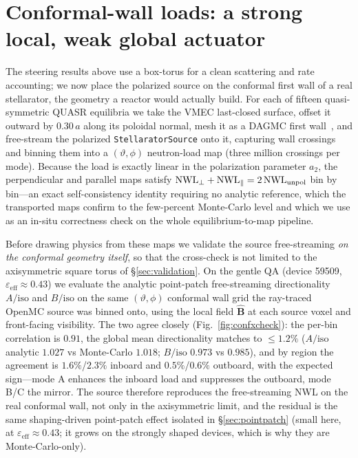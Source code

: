 \documentclass[11pt]{article}
\newcommand{\Bhat}{\hat{\bm{B}}}
\newcommand{\eps}{\varepsilon}
\newcommand{\epseff}{\eps_{\mathrm{eff}}}
\newcommand{\NWL}{\mathrm{NWL}}
\newcommand{\iso}{\mathrm{iso}}
\begin{document}
\section{Conformal-wall loads: a strong local, weak global actuator}
\label{sec:conformal}

The steering results above use a box-torus for a clean scattering and rate accounting; we
now place the polarized source on the conformal first wall of a real stellarator, the
geometry a reactor would actually build. For each of fifteen quasi-symmetric QUASR
equilibria we take the VMEC last-closed surface, offset it outward by $0.30\,a$ along its
poloidal normal, mesh it as a DAGMC first wall~\cite{dagmc}, and free-stream the polarized
\texttt{StellaratorSource} onto it, capturing wall crossings and binning them into a
$(\vartheta,\phi)$ neutron-load map (three million crossings per mode). Because the load is
exactly linear in the polarization parameter $a_2$, the perpendicular and parallel maps
satisfy $\NWL_{\perp}+\NWL_{\parallel}=2\,\NWL_{\rm unpol}$ bin by bin---an exact
self-consistency identity requiring no analytic reference, which the transported maps
confirm to the few-percent Monte-Carlo level and which we use as an in-situ correctness
check on the whole equilibrium-to-map pipeline.

Before drawing physics from these maps we validate the source free-streaming \emph{on the
conformal geometry itself}, so that the cross-check is not limited to the axisymmetric
square torus of \S\ref{sec:validation}. On the gentle QA (device 59509,
$\epseff\approx0.43$) we evaluate the analytic point-patch free-streaming directionality
$A/\iso$ and $B/\iso$ on the same $(\vartheta,\phi)$ conformal wall grid the ray-traced
OpenMC source was binned onto, using the local field $\Bhat$ at each source voxel and
front-facing visibility. The two agree closely (Fig.~\ref{fig:confxcheck}): the per-bin
correlation is $0.91$, the global mean directionality matches to $\le1.2\%$
($A/\iso$ analytic $1.027$ vs Monte-Carlo $1.018$; $B/\iso$ $0.973$ vs $0.985$), and by
region the agreement is $1.6\%$/$2.3\%$ inboard and $0.5\%$/$0.6\%$ outboard, with the
expected sign---mode A enhances the inboard load and suppresses the outboard, mode B/C the
mirror. The source therefore reproduces the free-streaming NWL on the real conformal wall,
not only in the axisymmetric limit, and the residual is the same shaping-driven point-patch
effect isolated in \S\ref{sec:pointpatch} (small here, at $\epseff\approx0.43$; it grows on
the strongly shaped devices, which is why they are Monte-Carlo-only).
\end{document}
